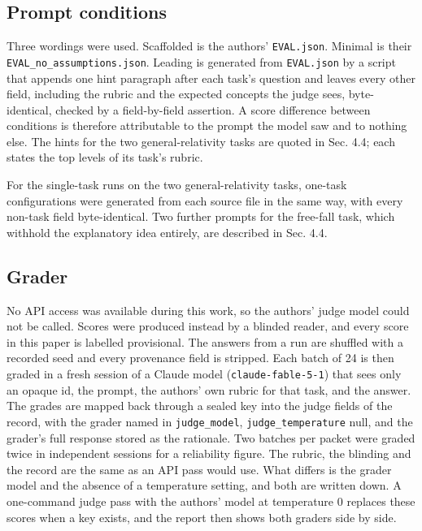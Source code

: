 \documentclass[reprint,prx,amsmath,amssymb,aps,superscriptaddress]{revtex4-2}
\begin{document}
\subsection{Prompt conditions}

Three wordings were used. Scaffolded is the authors' \texttt{EVAL.json}. Minimal is their \texttt{EVAL\_no\_assumptions.json}. Leading is generated from \texttt{EVAL.json} by a script that appends one hint paragraph after each task's question and leaves every other field, including the rubric and the expected concepts the judge sees, byte-identical, checked by a field-by-field assertion. A score difference between conditions is therefore attributable to the prompt the model saw and to nothing else. The hints for the two general-relativity tasks are quoted in Sec. 4.4; each states the top levels of its task's rubric.

For the single-task runs on the two general-relativity tasks, one-task configurations were generated from each source file in the same way, with every non-task field byte-identical. Two further prompts for the free-fall task, which withhold the explanatory idea entirely, are described in Sec. 4.4.

\subsection{Grader}

No API access was available during this work, so the authors' judge model could not be called. Scores were produced instead by a blinded reader, and every score in this paper is labelled provisional. The answers from a run are shuffled with a recorded seed and every provenance field is stripped. Each batch of 24 is then graded in a fresh session of a Claude model (\texttt{claude-fable-5-1}) that sees only an opaque id, the prompt, the authors' own rubric for that task, and the answer. The grades are mapped back through a sealed key into the judge fields of the record, with the grader named in \texttt{judge\_model}, \texttt{judge\_temperature} null, and the grader's full response stored as the rationale. Two batches per packet were graded twice in independent sessions for a reliability figure. The rubric, the blinding and the record are the same as an API pass would use. What differs is the grader model and the absence of a temperature setting, and both are written down. A one-command judge pass with the authors' model at temperature 0 replaces these scores when a key exists, and the report then shows both graders side by side.
\end{document}
